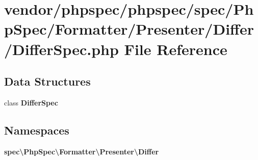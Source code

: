 \section{vendor/phpspec/phpspec/spec/\+Php\+Spec/\+Formatter/\+Presenter/\+Differ/\+Differ\+Spec.php File Reference}
\label{_differ_spec_8php}
\subsection*{Data Structures}
\begin{DoxyCompactItemize}
\item 
class {\bf Differ\+Spec}
\end{DoxyCompactItemize}
\subsection*{Namespaces}
\begin{DoxyCompactItemize}
\item 
 {\bf spec\textbackslash{}\+Php\+Spec\textbackslash{}\+Formatter\textbackslash{}\+Presenter\textbackslash{}\+Differ}
\end{DoxyCompactItemize}
